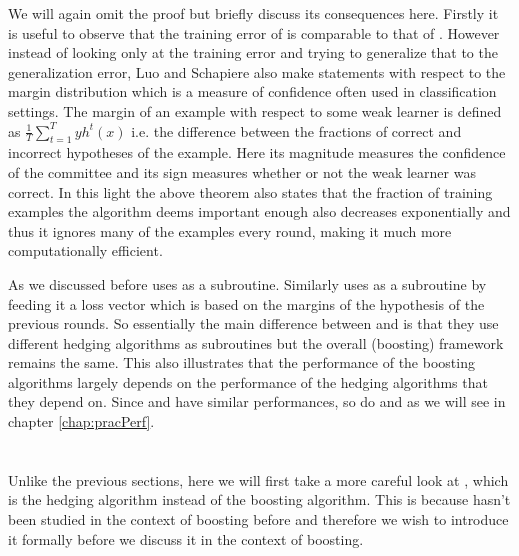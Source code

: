  We will again omit the proof but briefly discuss its consequences here. Firstly it is useful to observe that the training error of \NHB is comparable to that of \adaB. However instead of looking only at the training error and trying to generalize that to the generalization error, Luo and Schapiere also make statements with respect to the margin distribution which is a measure of confidence often used in classification settings. The margin of an example with respect to some weak learner is defined as $\frac1T \sum^T_{t=1}yh^t(x)$ i.e. the difference between the fractions of correct and incorrect hypotheses of the example. Here its magnitude measures the confidence of the committee and its sign measures whether or not the weak learner was correct. In this light the above theorem also states that the fraction of training examples the algorithm deems important enough also decreases exponentially and thus it ignores many of the examples every round, making it much more computationally efficient.

 \par As we discussed before \adaB uses \hedge as a subroutine. Similarly \NHB uses \adaN as a subroutine by feeding it a loss vector which is based on the margins of the hypothesis of the previous rounds. So essentially the main difference between \NHB and \adaB is that they use different hedging algorithms as subroutines but the overall (boosting) framework remains the same. This also illustrates that the performance of the boosting algorithms largely depends on the performance of the hedging algorithms that they depend on. Since \hedge and \adaN have similar performances, so do \adaB and \NHB as we will see in chapter \ref{chap:pracPerf}.


\section{\squintB}
\label{sec:squintB}
Unlike the previous sections, here we will first take a more careful look at \squint, which is the hedging algorithm instead of the boosting algorithm. This is because \squint hasn't been studied in the context of boosting before and therefore we wish to introduce it formally before we discuss it in the context of boosting. 

